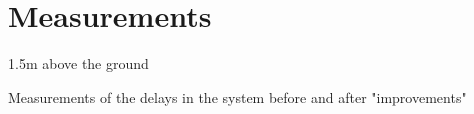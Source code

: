\section{Measurements}

1.5m above the ground

Measurements of the delays in the system before and after "improvements"